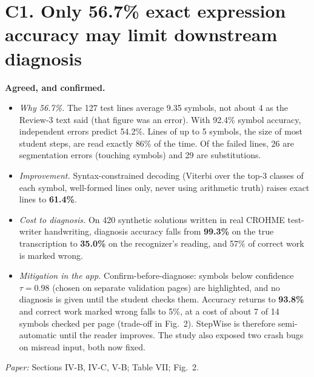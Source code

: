 \documentclass[10pt]{article}
\begin{document}
\section*{C1. Only 56.7\% exact expression accuracy may limit downstream diagnosis}
\textbf{Agreed, and confirmed.}
\begin{itemize}
\item \textit{Why 56.7\%.} The 127 test lines average 9.35 symbols, not about 4 as the Review-3 text
said (that figure was an error). With 92.4\% symbol accuracy, independent errors predict 54.2\%.
Lines of up to 5 symbols, the size of most student steps, are read exactly 86\% of the time. Of the
failed lines, 26 are segmentation errors (touching symbols) and 29 are substitutions.
\item \textit{Improvement.} Syntax-constrained decoding (Viterbi over the top-3 classes of each
symbol, well-formed lines only, never using arithmetic truth) raises exact lines to \textbf{61.4\%}.
\item \textit{Cost to diagnosis.} On 420 synthetic solutions written in real CROHME test-writer
handwriting, diagnosis accuracy falls from \textbf{99.3\%} on the true transcription to
\textbf{35.0\%} on the recognizer's reading, and 57\% of correct work is marked wrong.
\item \textit{Mitigation in the app.} Confirm-before-diagnose: symbols below confidence
$\tau=0.98$ (chosen on separate validation pages) are highlighted, and no diagnosis is given until the
student checks them. Accuracy returns to \textbf{93.8\%} and correct work marked wrong falls to 5\%,
at a cost of about 7 of 14 symbols checked per page (trade-off in Fig.~2). StepWise is therefore
semi-automatic until the reader improves. The study also exposed two crash bugs on misread input,
both now fixed.
\end{itemize}
\textit{Paper:} Sections IV-B, IV-C, V-B; Table VII; Fig.~2.
\end{document}
